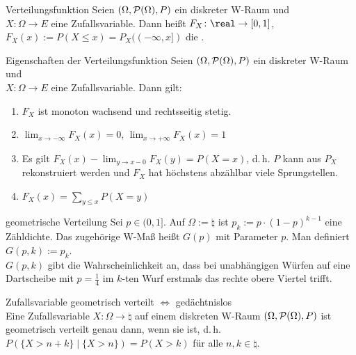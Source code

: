 \linie

\begin{Def}{Verteilungsfunktion}
    Seien $(\Omega, \P(\Omega), P)$ ein diskreter W-Raum und\\
    $X\colon \Omega \rightarrow E$ eine Zufallsvariable.
    Dann heißt $F_X\colon \real \rightarrow [0, 1]$,\\
    $F_X(x) := P(X \le x) = P_X((-\infty, x])$ die
    .
\end{Def}

\begin{Satz}{Eigenschaften der Verteilungsfunktion}
    Seien $(\Omega, \P(\Omega), P)$ ein diskreter W-Raum und\\
    $X\colon \Omega \rightarrow E$ eine Zufallsvariable.
    Dann gilt:
    \begin{enumerate}
        \item
        $F_X$ ist monoton wachsend und rechtsseitig stetig.
        
        \item
        $\lim_{x \to -\infty} F_X(x) = 0$,
        $\lim_{x \to +\infty} F_X(x) = 1$
        
        \item
        Es gilt $F_X(x) - \lim_{y \to x - 0} F_X(y) = P(X = x)$,
        d.\,h. $P$ kann aus $P_X$ rekonstruiert werden und
        $F_X$ hat höchstens abzählbar viele Sprungstellen.
        
        \item
        $F_X(x) = \sum_{y \le x} P(X = y)$
    \end{enumerate}
\end{Satz}

\linie

\begin{Def}{geometrische Verteilung}
    Sei $p \in (0, 1]$. Auf $\Omega := \natural$ ist
    $p_k := p \cdot (1 - p)^{k-1}$ eine Zähldichte.
    Das zugehörige W-Maß heißt  $G(p)$ mit Parameter $p$.
    Man definiert $G(p, k) := p_k$.\\
    $G(p, k)$ gibt die Wahrscheinlichkeit an, dass bei unabhängigen Würfen auf eine Dartscheibe
    mit $p = \frac{1}{4}$ im $k$-ten Wurf erstmals das rechte obere Viertel trifft.
\end{Def}

\begin{Satz}{Zufallsvariable geometrisch verteilt $\iff$ gedächtnislos}\\
    Eine Zufallsvariable $X\colon \Omega \rightarrow \natural$ auf einem diskreten W-Raum
    $(\Omega, \P(\Omega), P)$ ist geometrisch verteilt genau dann, wenn sie 
    ist, d.\,h. $P(\{X > n + k\} \;|\; \{X > n\}) = P(X > k)$ für alle $n, k \in \natural$.
\end{Satz}

